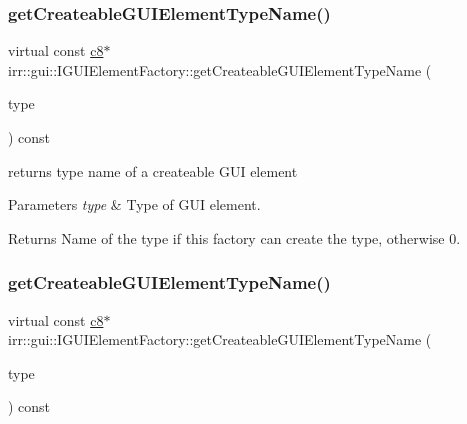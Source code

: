 \subsubsection{\texorpdfstring{get\+Createable\+G\+U\+I\+Element\+Type\+Name()}{getCreateableGUIElementTypeName()}\hspace{0.1cm}{\footnotesize\ttfamily [3/4]}}
{\footnotesize\ttfamily virtual const \hyperlink{namespaceirr_a9395eaea339bcb546b319e9c96bf7410}{c8}$\ast$ irr\+::gui\+::\+I\+G\+U\+I\+Element\+Factory\+::get\+Createable\+G\+U\+I\+Element\+Type\+Name (\begin{DoxyParamCaption}\item[{\hyperlink{namespaceirr_1_1gui_ae4d66df0ecf4117cdbcf9f22404bd254}{E\+G\+U\+I\+\_\+\+E\+L\+E\+M\+E\+N\+T\+\_\+\+T\+Y\+PE}}]{type }\end{DoxyParamCaption}) const\hspace{0.3cm}{\ttfamily [pure virtual]}}



returns type name of a createable G\+UI element 


\begin{DoxyParams}{Parameters}
{\em type} & Type of G\+UI element. \\
\hline
\end{DoxyParams}
\begin{DoxyReturn}{Returns}
Name of the type if this factory can create the type, otherwise 0. 
\end{DoxyReturn}
\mbox{\label{classirr_1_1gui_1_1IGUIElementFactory_a1e692e1f746ee69815bf25981ee0facf}} 
\subsubsection{\texorpdfstring{get\+Createable\+G\+U\+I\+Element\+Type\+Name()}{getCreateableGUIElementTypeName()}\hspace{0.1cm}{\footnotesize\ttfamily [4/4]}}
{\footnotesize\ttfamily virtual const \hyperlink{namespaceirr_a9395eaea339bcb546b319e9c96bf7410}{c8}$\ast$ irr\+::gui\+::\+I\+G\+U\+I\+Element\+Factory\+::get\+Createable\+G\+U\+I\+Element\+Type\+Name (\begin{DoxyParamCaption}\item[{\hyperlink{namespaceirr_1_1gui_ae4d66df0ecf4117cdbcf9f22404bd254}{E\+G\+U\+I\+\_\+\+E\+L\+E\+M\+E\+N\+T\+\_\+\+T\+Y\+PE}}]{type }\end{DoxyParamCaption}) const\hspace{0.3cm}{\ttfamily [pure virtual]}}



